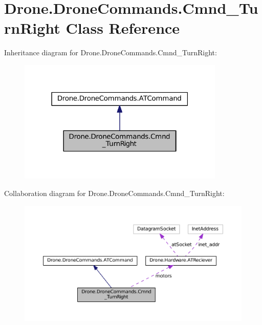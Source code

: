 \hypertarget{class_drone_1_1_drone_commands_1_1_cmnd___turn_right}{}\section{Drone.\+Drone\+Commands.\+Cmnd\+\_\+\+Turn\+Right Class Reference}
\label{class_drone_1_1_drone_commands_1_1_cmnd___turn_right}


Inheritance diagram for Drone.\+Drone\+Commands.\+Cmnd\+\_\+\+Turn\+Right\+:\nopagebreak
\begin{figure}[H]
\begin{center}
\leavevmode
\includegraphics[width=279pt]{class_drone_1_1_drone_commands_1_1_cmnd___turn_right__inherit__graph}
\end{center}
\end{figure}


Collaboration diagram for Drone.\+Drone\+Commands.\+Cmnd\+\_\+\+Turn\+Right\+:\nopagebreak
\begin{figure}[H]
\begin{center}
\leavevmode
\includegraphics[width=350pt]{class_drone_1_1_drone_commands_1_1_cmnd___turn_right__coll__graph}
\end{center}
\end{figure}

